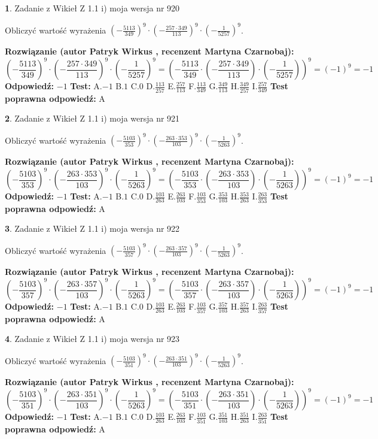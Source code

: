 \documentclass[12pt, a4paper]{article}
\theoremstyle{definition} %
\newtheorem{zad}{}
\newcommand{\zadStart}[1]{\begin{zad}#1\newline}
\newcommand{\zadStop}{\end{zad}}
\newcommand{\rozwStart}[2]{\noindent \textbf{Rozwiązanie (autor #1 , recenzent #2): }\newline}
\newcommand{\rozwStop}{\newline}
\newcommand{\odpStart}{\noindent \textbf{Odpowiedź:}\newline}
\newcommand{\odpStop}{\newline}
\newcommand{\testStart}{\noindent \textbf{Test:}\newline}
\newcommand{\testStop}{\newline}
\newcommand{\kluczStart}{\noindent \textbf{Test poprawna odpowiedź:}\newline}
\newcommand{\kluczStop}{\newline}
\begin{document}
\zadStart{Zadanie z Wikieł Z 1.1 i) moja wersja nr 920}

Obliczyć wartość wyrażenia $(-\frac{5113}{349})^{9} \cdot (-\frac{257 \cdot 349}{113})^{9} \cdot (-\frac{1}{5257})^{9}$.
\zadStop
\rozwStart{Patryk Wirkus}{Martyna Czarnobaj}
$$(-\frac{5113}{349})^{9} \cdot (-\frac{257 \cdot 349}{113})^{9} \cdot (-\frac{1}{5257})^{9} = (-\frac{5113}{349} \cdot (-\frac{257 \cdot 349}{113}) \cdot (-\frac{1}{5257}))^{9} = (-1)^{9} = -1$$
\rozwStop
\odpStart
$-1$
\odpStop
\testStart
A.$-1$ B.$1$ C.$0$ D.$\frac{113}{257}$ E.$\frac{257}{113}$
F.$\frac{113}{349}$ G.$\frac{349}{113}$
H.$\frac{349}{257}$
I.$\frac{257}{349}$
\testStop
\kluczStart
A
\kluczStop



\zadStart{Zadanie z Wikieł Z 1.1 i) moja wersja nr 921}

Obliczyć wartość wyrażenia $(-\frac{5103}{353})^{9} \cdot (-\frac{263 \cdot 353}{103})^{9} \cdot (-\frac{1}{5263})^{9}$.
\zadStop
\rozwStart{Patryk Wirkus}{Martyna Czarnobaj}
$$(-\frac{5103}{353})^{9} \cdot (-\frac{263 \cdot 353}{103})^{9} \cdot (-\frac{1}{5263})^{9} = (-\frac{5103}{353} \cdot (-\frac{263 \cdot 353}{103}) \cdot (-\frac{1}{5263}))^{9} = (-1)^{9} = -1$$
\rozwStop
\odpStart
$-1$
\odpStop
\testStart
A.$-1$ B.$1$ C.$0$ D.$\frac{103}{263}$ E.$\frac{263}{103}$
F.$\frac{103}{353}$ G.$\frac{353}{103}$
H.$\frac{353}{263}$
I.$\frac{263}{353}$
\testStop
\kluczStart
A
\kluczStop



\zadStart{Zadanie z Wikieł Z 1.1 i) moja wersja nr 922}

Obliczyć wartość wyrażenia $(-\frac{5103}{357})^{9} \cdot (-\frac{263 \cdot 357}{103})^{9} \cdot (-\frac{1}{5263})^{9}$.
\zadStop
\rozwStart{Patryk Wirkus}{Martyna Czarnobaj}
$$(-\frac{5103}{357})^{9} \cdot (-\frac{263 \cdot 357}{103})^{9} \cdot (-\frac{1}{5263})^{9} = (-\frac{5103}{357} \cdot (-\frac{263 \cdot 357}{103}) \cdot (-\frac{1}{5263}))^{9} = (-1)^{9} = -1$$
\rozwStop
\odpStart
$-1$
\odpStop
\testStart
A.$-1$ B.$1$ C.$0$ D.$\frac{103}{263}$ E.$\frac{263}{103}$
F.$\frac{103}{357}$ G.$\frac{357}{103}$
H.$\frac{357}{263}$
I.$\frac{263}{357}$
\testStop
\kluczStart
A
\kluczStop



\zadStart{Zadanie z Wikieł Z 1.1 i) moja wersja nr 923}

Obliczyć wartość wyrażenia $(-\frac{5103}{351})^{9} \cdot (-\frac{263 \cdot 351}{103})^{9} \cdot (-\frac{1}{5263})^{9}$.
\zadStop
\rozwStart{Patryk Wirkus}{Martyna Czarnobaj}
$$(-\frac{5103}{351})^{9} \cdot (-\frac{263 \cdot 351}{103})^{9} \cdot (-\frac{1}{5263})^{9} = (-\frac{5103}{351} \cdot (-\frac{263 \cdot 351}{103}) \cdot (-\frac{1}{5263}))^{9} = (-1)^{9} = -1$$
\rozwStop
\odpStart
$-1$
\odpStop
\testStart
A.$-1$ B.$1$ C.$0$ D.$\frac{103}{263}$ E.$\frac{263}{103}$
F.$\frac{103}{351}$ G.$\frac{351}{103}$
H.$\frac{351}{263}$
I.$\frac{263}{351}$
\testStop
\kluczStart
A
\kluczStop
\end{document}

